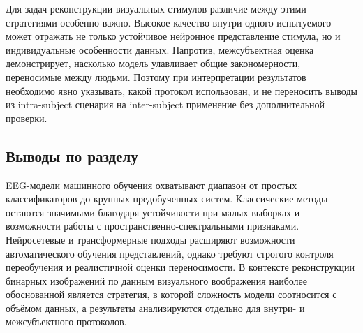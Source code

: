 Для задач реконструкции визуальных стимулов различие между этими стратегиями особенно важно. Высокое качество внутри одного испытуемого может отражать не только устойчивое нейронное представление стимула, но и индивидуальные особенности данных. Напротив, межсубъектная оценка демонстрирует, насколько модель улавливает общие закономерности, переносимые между людьми. Поэтому при интерпретации результатов необходимо явно указывать, какой протокол использован, и не переносить выводы из intra-subject сценария на inter-subject применение без дополнительной проверки.

\subsection*{Выводы по разделу}

EEG-модели машинного обучения охватывают диапазон от простых классификаторов до крупных предобученных систем. Классические методы остаются значимыми благодаря устойчивости при малых выборках и возможности работы с пространственно-спектральными признаками. Нейросетевые и трансформерные подходы расширяют возможности автоматического обучения представлений, однако требуют строгого контроля переобучения и реалистичной оценки переносимости. В контексте реконструкции бинарных изображений по данным визуального воображения наиболее обоснованной является стратегия, в которой сложность модели соотносится с объёмом данных, а результаты анализируются отдельно для внутри- и межсубъектного протоколов.
